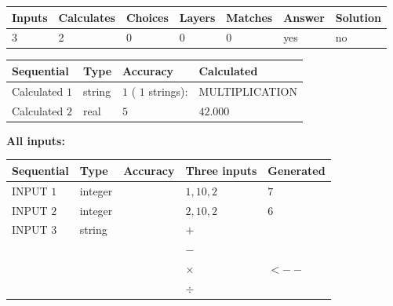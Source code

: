 \documentclass[12pt]{article}
\begin{document}
 
 
\noindent{}
 
 

 
\vspace{0.3in}
   
   
   
   
\noindent\begin{tabular}{|l|l|l|l|l|l|l|}
 \hline
Inputs & Calculates & Choices & Layers & Matches & Answer & Solution \\ \hline
           3  & 
           2  & 
           0
  & 
           0  & 
           0  & 
  yes & 
  no 
  \\ \hline
 \end{tabular}
   
   
   
   
\noindent{}
   
   
  
  
\noindent\begin{tabular}{|l|l|l|l|}
\hline
 Sequential & Type & Accuracy & Calculated \\ 
\hline
 
 
  Calculated $            1 $ & string & $            1  $ ( $           1  $ strings): 
 & MULTIPLICATION
 \\  \hline  
 
 
  Calculated $            2 $ & real & $            5  $ & 
 $ 42.000 $ 
 \\  \hline  
 \end{tabular}
   
   
   
   
\noindent\vspace{0.1in}\hspace{-0.08in} {\textbf{\Large{All inputs: }}}
   
   
  
  
\noindent\begin{tabular}{|l|l|l|l|l|}
\hline
 Sequential & Type & Accuracy & Three inputs & Generated \\ 
\hline
 
 
  INPUT $            1 $ & integer &  & $
 1
 , 
 10
 , 
 2
 $ & $ 7 $ 
 \\  \hline  
 
 
  INPUT $            2 $ & integer &  & $
 2
 , 
 10
 , 
 2
 $ & $ 6 $ 
 \\  \hline  
 
 
  INPUT $            3 $ & string & & 
 $+$ & 
  \\
  & & & 
 $-$ & 
  \\
  & & & 
 $\times$ & 
  $ <-- $ 
  \\
  & & & 
 $\div$ & 
 \\  \hline  
 \end{tabular}
   
\end{document}

